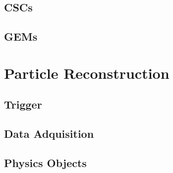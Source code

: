 \subsection{CSCs}
\label{subsec:CSCs}

\subsection{GEMs}
\label{subsec:GEMs}

\section{Particle Reconstruction}
\label{sec:ParticleReconstruction}

\subsection{Trigger}
\label{subsec:Trigger}

\subsection{Data Adquisition}
\label{subsec:DAQ}

\subsection{Physics Objects}
\label{subsec:PhysicsObjects}
